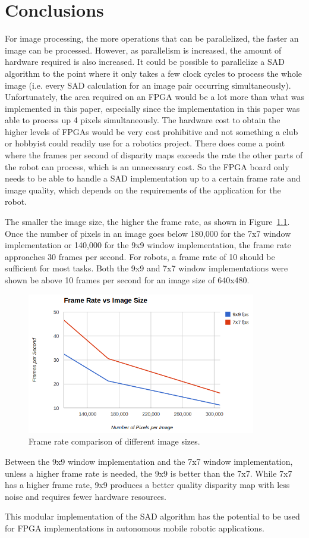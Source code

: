 \chapter{Conclusions}
\label{sec:concl}

For image processing, the more operations that can be parallelized, the faster an image can be processed. However, as parallelism is increased, the amount of hardware required is also increased. It could be possible to parallelize a SAD algorithm to the point where it only takes a few clock cycles to process the whole image (i.e. every SAD calculation for an image pair occurring simultaneously). Unfortunately, the area required on an FPGA would be a lot more than what was implemented in this paper, especially since the implementation in this paper was able to process up 4 pixels simultaneously. The hardware cost to obtain the higher levels of FPGAs would be very cost prohibitive and not something a club or hobbyist could readily use for a robotics project. There does come a point where the frames per second of disparity maps exceeds the rate the other parts of the robot can process, which is an unnecessary cost. So the FPGA board only needs to be able to handle a SAD implementation up to a certain frame rate and image quality, which depends on the requirements of the application for the robot.

The smaller the image size, the higher the frame rate, as shown in Figure~\ref{fig:frameRate}. Once the number of pixels in an image goes below 180,000 for the 7x7 window implementation or 140,000 for the 9x9 window implementation, the frame rate approaches 30 frames per second. For robots, a frame rate of 10 should be sufficient for most tasks. Both the 9x9 and 7x7 window implementations were shown be above 10 frames per second for an image size of 640x480.

\begin{figure}[h]
	\begin{center}
		\includegraphics[width=100mm]{figures/frameRate.png}
		\captionfonts
		\caption{Frame rate comparison of different image sizes.}
		\label{fig:frameRate}
	\end{center}
\end{figure}

Between the 9x9 window implementation and the 7x7 window implementation, unless a higher frame rate is needed, the 9x9 is better than the 7x7. While 7x7 has a higher frame rate, 9x9 produces a better quality disparity map with less noise and requires fewer hardware resources.

This modular implementation of the SAD algorithm has the potential to be used for FPGA implementations in autonomous mobile robotic applications.